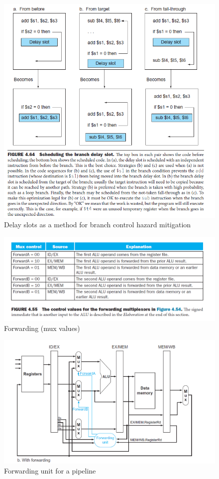 \documentclass{scrartcl}
\begin{document}
\begin{figure}[h]
\centering
\includegraphics[scale=0.7]{Images/delay_slot.png}
\caption{Delay slots as a method for branch control hazard mitigation}
\end{figure}

\begin{figure}[h]
\centering
\includegraphics[scale=0.5]{Images/forwarding_mux_values.png}
\caption{Forwarding (mux values)}
\end{figure}

\begin{figure}[h]
\centering
\includegraphics[scale=0.5]{Images/forwarding.png}
\caption{Forwarding unit for a pipeline}
\end{figure}
\end{document}
